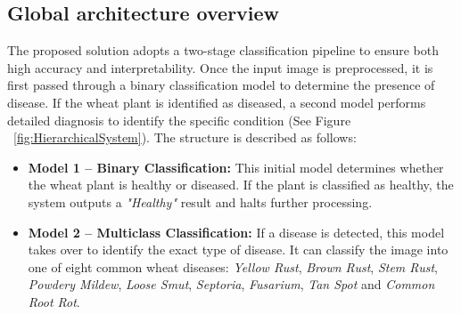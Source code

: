 \subsection{Global architecture overview}
The proposed solution adopts a two-stage classification pipeline to ensure both high accuracy and interpretability. Once the input image is preprocessed, it is first passed through a binary classification model to determine the presence of disease. If the wheat plant is identified as diseased, a second model performs detailed diagnosis to identify the specific condition (See Figure ~\ref{fig:HierarchicalSystem}). The structure is described as follows:
\begin{itemize} 
    \item \textbf{Model 1 – Binary Classification:} This initial model determines whether the wheat plant is healthy or diseased. If the plant is classified as healthy, the system outputs a \textit{"Healthy"} result and halts further processing.

    \item \textbf{Model 2 – Multiclass Classification:} If a disease is detected, this model takes over to identify the exact type of disease. It can classify the image into one of eight common wheat diseases: \textit{Yellow Rust}, \textit{Brown Rust}, \textit{Stem Rust}, \textit{Powdery Mildew}, \textit{Loose Smut}, \textit{Septoria}, \textit{Fusarium},  \textit{Tan Spot} and \textit{Common Root Rot}.
\end{itemize}


